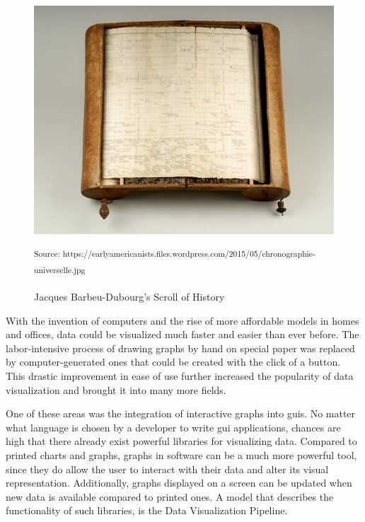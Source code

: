 \begin{figure}[h]
    \centering
    \includegraphics[width=12cm]{resources/img/ScrollOfHistory}
    \caption{Jacques Barbeu-Dubourg's Scroll of History}
    \small\textsuperscript{Source: https://earlyamericanists.files.wordpress.com/2015/05/chronographie-universelle.jpg}
    \label{fig:historyscroll}
\end{figure}

With the invention of computers and the rise of more affordable models in homes
and offices, data could be visualized much faster and easier than ever before.
The labor-intensive process of drawing graphs by hand on special paper was
replaced by computer-generated ones that could be created with the click of a
button. This drastic improvement in ease of use further increased the popularity
of data visualization and brought it into many more fields.
\cite{DataVisHistory2}

One of these areas was the integration of interactive graphs into \glspl{gui}.
No matter what language is chosen by a developer to write \gls{gui}
applications, chances are high that there already exist powerful libraries for
visualizing data. Compared to printed charts and graphs, graphs in software can
be a much more powerful tool, since they do allow the user to interact with
their data and alter its visual representation. Additionally, graphs
displayed on a screen can be updated when new data is available compared to
printed ones. A model that describes the functionality of such libraries, is
the Data Visualization Pipeline.
\cite{VisIdioms}





